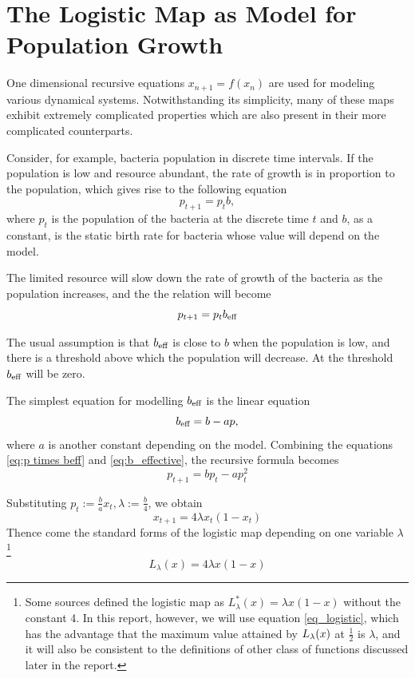 \section{The Logistic Map as Model for Population Growth}

One dimensional recursive equations $x_{n+1} = f(x_n)$ are used for modeling various dynamical systems. 
Notwithstanding its simplicity, many of these maps exhibit extremely complicated properties which are also present in their more complicated counterparts.

Consider, for example, bacteria population in discrete time intervals. 
If the population is low and resource abundant, the rate of growth is in proportion to the population, which gives rise to the following equation
\begin{equation}\label{eq:1d iterative map}
p_{t+1} = p_{t} b,
\end{equation}
where $p_{t}$ is the population of the bacteria at the discrete time $t$ and $b$, as a constant, is the static birth rate for bacteria whose value will depend on the model.

The limited resource will slow down the rate of growth of the bacteria as the population increases, and the the relation will become 
\begin{equation}\label{eq:p times beff}
	p_{t+1} =  p_{t} b_\text{eff}
\end{equation}

The usual assumption is that $b_\text{eff}$ is close to $b$ when the population is low, and there is a threshold above which the population will decrease. 
At the threshold $b_\text{eff}$ will be zero.

The simplest equation for modelling $b_\text{eff}$ is the linear equation
\begin{equation} \label{eq:b_effective}
b_\text{eff} = b - ap,
\end{equation}
where $a$ is another constant depending on the model.
Combining the equations \eqref{eq:p times beff} and \eqref{eq:b_effective}, the recursive formula becomes 
$$
p_{t+1}  = b p_t - ap_t^2
$$

Substituting $p_{t} := \frac{b}{a} x_{t}, \lambda := \frac{b}{4}$, we obtain
$$
x_{t+1} = 4 \lambda x_t(1-x_t) 
$$
Thence come the standard forms of the logistic map depending on one variable $\lambda$
\footnote{
Some sources defined the logistic map as $L^*_{\lambda}(x) = \lambda x(1-x)$ without the constant 4. 
In this report, however, we will use equation \ref{eq_logistic}, which has the advantage that the maximum value attained by $L_{\lambda}(x)$ at $\frac{1}{2}$ is $\lambda$, and it will also be consistent to the definitions of other class of functions discussed later in the report.
}
\begin{equation}\label{eq_logistic}
	L_{\lambda}(x) = 4 \lambda x(1-x)
\end{equation}

